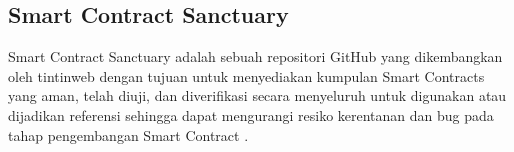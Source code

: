 \subsection{Smart Contract Sanctuary}
\label{subsec:sc-sanctuary}

Smart Contract Sanctuary adalah sebuah repositori GitHub yang dikembangkan oleh tintinweb dengan tujuan untuk menyediakan kumpulan Smart Contracts yang aman, telah diuji, dan diverifikasi secara menyeluruh untuk digunakan atau dijadikan referensi sehingga dapat mengurangi resiko kerentanan dan bug pada tahap pengembangan Smart Contract \parencite{smart_contract_sanctuary}.